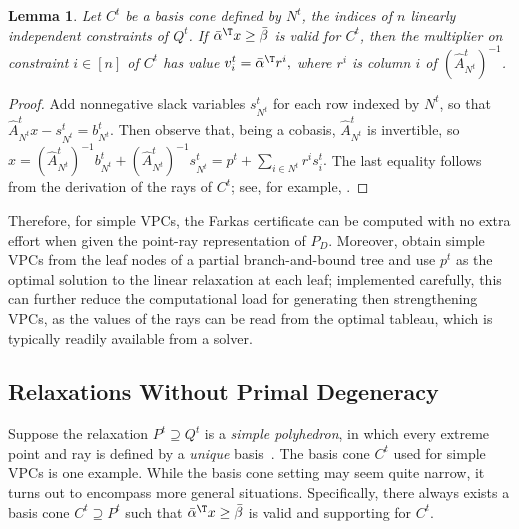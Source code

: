 \documentclass[oribibl,envcountsame]{llncs}
\newtheorem{lemma}[theorem]{Lemma}
\theoremstyle{remark}
\theoremstyle{definition}
\newcommand{\PD}{P_{D}}
\newcommand{\submx}[2]{#1_{#2}}
\begin{document}
\begin{lemma}
\label{lem:A^t-invertible}
    Let $C^t$ be a basis cone defined by $N^t$, the indices of $n$ linearly independent constraints of $Q^t$.
    If $\bar{\alpha}^\T x \ge \bar{\beta}$ is valid for 
    $C^t$,
    then the multiplier on constraint $i \in [n]$ of $C^t$ has value
        $
            v^t_i = \bar{\alpha}^\T r^i,
        $
    where $r^i$ is column $i$ of $(\submx{\hat{A}^t}{N^t})^{-1}$.
\end{lemma}
\begin{proof}
    Add nonnegative slack variables $s^t_{N^t}$ for each row indexed by $N^t$, so that $\submx{\hat{A}^t}{N^t} x - s^t_{N^t} = b^t_{N^t}$.
    Then observe that, being a cobasis, $\submx{\hat{A}^t}{N^t}$ is invertible,
    so 
        $
            x 
                = (\submx{\hat{A}^t}{N^t})^{-1} b^t_{N^t} + (\submx{\hat{A}^t}{N^t})^{-1} s^t_{N^t} 
                = p^t + \sum_{i \in N^t} r^i s^t_i.
        $
    The last equality follows from the derivation of the rays of $C^t$; see, for example, \citet[Chapter~6]{ConCorZam14}.
\end{proof}

Therefore, for simple VPCs, the Farkas certificate can be computed with no extra effort when given the point-ray representation of $\PD$.
Moreover, \citet{BalKaz22+_vpc-arxiv} obtain simple VPCs from the leaf nodes of a partial branch-and-bound tree and use $p^t$ as the optimal solution to the linear relaxation at each leaf;
implemented carefully, this can further reduce the computational load for generating then strengthening VPCs, as the values of the rays can be read from the optimal tableau,
which is typically readily available from a solver.

\subsection{Relaxations Without Primal Degeneracy}
\label{sec:simple}


Suppose the relaxation $P^t \supseteq Q^t$ is a \emph{simple polyhedron}, in which every extreme point and ray is defined by a \emph{unique} basis~\cite{Ziegler95}.
The basis cone $C^t$ used for simple VPCs is one example.
While the basis cone setting may seem quite narrow, it turns out to encompass more general situations.
Specifically, there always exists a basis cone $C^t \supseteq P^t$ such that $\bar{\alpha}^\T x \ge \bar{\beta}$ is valid and supporting for $C^t$.
\end{document}
